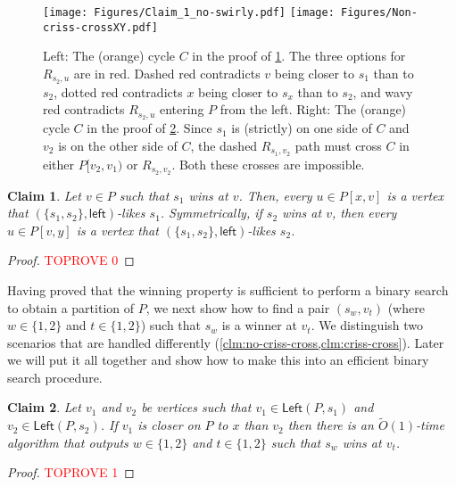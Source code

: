\documentclass{article}
\newcommand{\Left}{\mathsf{Left}}
\newcommand{\leftside}{\mathsf{left}}
\newtheorem{claim}{Claim}
\newcommand{\Otild}{\tilde{O}}
\begin{document}
\begin{figure}[htb]
     \centering
     \texttt{[image: Figures/Claim\_1\_no-swirly.pdf]}
     \hspace{1in}\texttt{[image: Figures/Non-criss-crossXY.pdf]}

     \caption{Left: The (orange) cycle $C$ in the proof of \cref{clm:winner_takes_something}. The three options for $R_{s_2,u}$ are in red. Dashed red contradicts $v$ being closer to $s_1$ than to $s_2$, dotted red contradicts $x$ being closer to $s_x$ than to $s_2$, and wavy red contradicts $R_{s_2,u}$ entering $P$ from the left. Right: The (orange) cycle $C$ in the proof of \cref{clm:no-criss-cross}. Since $s_1$ is (strictly) on one side of $C$ and $v_2$ is on the other side of $C$,  the dashed  $R_{s_1,v_2}$ path must cross $C$ in either  $P[v_2,v_1)$ or  $R_{s_2,v_2}$.
        Both these crosses are impossible.}
\label{fig:winner_takes_something}
 \end{figure}
\begin{claim} \label{clm:winner_takes_something}
Let $v\in P$ such that $s_1$ wins at $v$.
Then, every $u\in P[x,v]$ is a vertex that $(\{s_1,s_2\},\leftside)$-likes $s_1$.
Symmetrically, if $s_2$ wins at $v$, then every $u\in P[v,y]$ is a vertex that $(\{s_1,s_2\},\leftside)$-likes $s_2$.
\end{claim}
\begin{proof}\textcolor{red}{TOPROVE 0}\end{proof}

Having proved that the winning property  is sufficient to perform a binary search to obtain a partition of $P$, we next show how to find a pair $(s_w,v_t)$ (where $w\in\{1,2\}$ and $t\in\{1,2\}$) such that $s_w$ is a winner at $v_t$.
We distinguish two scenarios that are handled differently (\cref{clm:no-criss-cross,clm:criss-cross}).
Later we will put it all together and show how to make this into an efficient binary search procedure.

    \begin{claim}\label{clm:no-criss-cross}
        Let $v_1$ and $v_2$ be  vertices such that $v_1\in\Left(P,s_1)$ and $v_2\in\Left(P,s_2)$.
        If $v_1$ is closer on $P$ to $x$ than $v_2$ then there is an $\Otild(1)$-time algorithm that outputs $w\in\{1,2\}$ and $t\in\{1,2\}$ such that $s_w$ wins at $v_t$.
    \end{claim}
    \begin{proof}\textcolor{red}{TOPROVE 1}\end{proof}
\end{document}
